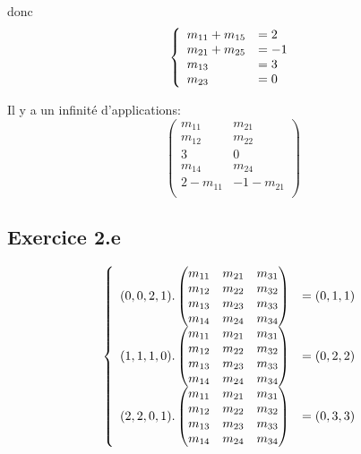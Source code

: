 \documentclass[]{book}
\theoremstyle{definition}
\begin{document}
donc
$$
\left\{
\begin{array}{l l}
m_{11} + m_{15} & = 2 \\
m_{21} + m_{25} & = -1 \\
m_{13} & = 3 \\
m_{23} & = 0 \\
\end{array}
\right.
$$

Il y a un infinit\'e d'applications:
$$
\begin{pmatrix}
m_{11} & m_{21} \\
m_{12} & m_{22} \\
3 & 0 \\
m_{14} & m_{24} \\
2 - m_{11} & -1 - m_{21} \\
\end{pmatrix} 
$$

\subsection*{Exercice 2.e}
$$
\left\{
\begin{array}{l l}
(0, 0, 2, 1) . 
\begin{pmatrix}
m_{11} & m_{21} & m_{31} \\
m_{12} & m_{22} & m_{32} \\
m_{13} & m_{23} & m_{33} \\
m_{14} & m_{24} & m_{34} \\
\end{pmatrix} 
& = (0, 1, 1) \\

(1, 1, 1, 0) . 
\begin{pmatrix}
m_{11} & m_{21} & m_{31} \\
m_{12} & m_{22} & m_{32} \\
m_{13} & m_{23} & m_{33} \\
m_{14} & m_{24} & m_{34} \\
\end{pmatrix} 
& = (0, 2, 2) \\

(2, 2, 0, 1) . 
\begin{pmatrix}
m_{11} & m_{21} & m_{31} \\
m_{12} & m_{22} & m_{32} \\
m_{13} & m_{23} & m_{33} \\
m_{14} & m_{24} & m_{34} \\
\end{pmatrix} 
& = (0, 3, 3) \\
\end{array}
\right.
$$
\end{document}
